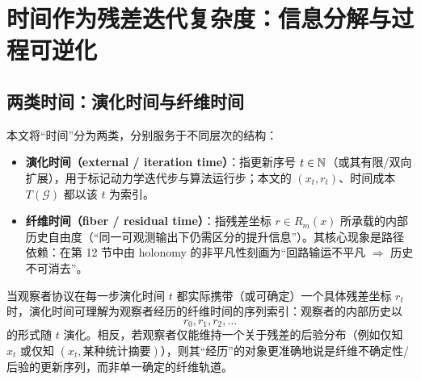 \section{时间作为残差迭代复杂度：信息分解与过程可逆化}

\subsection{两类时间：演化时间与纤维时间}

\begin{definition}[演化时间与纤维时间]\label{def:two_times}
\InterfaceTag
本文将“时间”分为两类，分别服务于不同层次的结构：
\begin{itemize}
  \item \textbf{演化时间（external / iteration time）}：指更新序号 $t\in\mathbb{N}$（或其有限/双向扩展），用于标记动力学迭代步与算法运行步；本文的 $(x_t,r_t)$、时间成本 $T(\mathcal G)$ 都以该 $t$ 为索引。
  \item \textbf{纤维时间（fiber / residual time）}：指残差坐标 $r\in R_m(x)$ 所承载的内部历史自由度（“同一可观测输出下仍需区分的提升信息”）。其核心现象是路径依赖：在第 12 节中由 holonomy 的非平凡性刻画为“回路输运不平凡 $\Rightarrow$ 历史不可消去”。
\end{itemize}
\end{definition}

\begin{remark}\label{rem:evolution_as_fiber_experience}
\InterfaceTag
当观察者协议在每一步演化时间 $t$ 都实际携带（或可确定）一个具体残差坐标 $r_t$ 时，演化时间可理解为观察者经历的纤维时间的序列索引：观察者的内部历史以
$$
r_0,r_1,r_2,\dots
$$
的形式随 $t$ 演化。相反，若观察者仅能维持一个关于残差的后验分布（例如仅知 $x_t$ 或仅知 $(x_t,\text{某种统计摘要})$），则其“经历”的对象更准确地说是纤维不确定性/后验的更新序列，而非单一确定的纤维轨道。
\end{remark}


